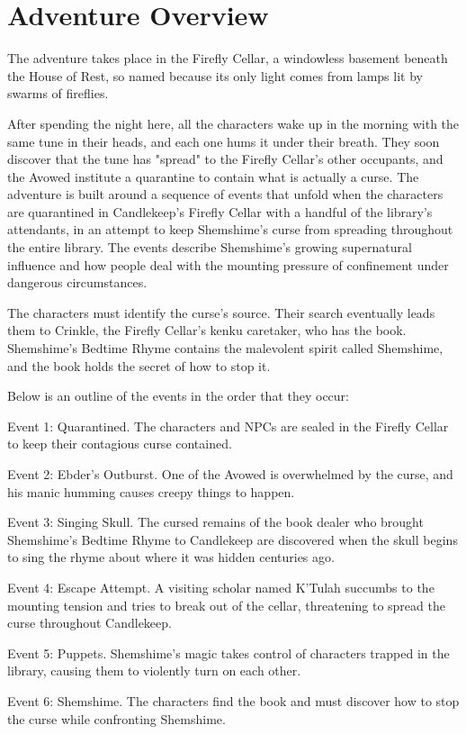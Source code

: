 \documentclass[10pt,a4paper,twoside,bg=print,twocolumn,openany,nodeprecatedcode]{dndbook}
\begin{document}
\section{Adventure Overview}
The adventure takes place in the Firefly Cellar, a windowless basement beneath the House of Rest, so named because its only light comes from lamps lit by swarms of fireflies.

After spending the night here, all the characters wake up in the morning with the same tune in their heads, and each one hums it under their breath. They soon discover that the tune has "spread" to the Firefly Cellar's other occupants, and the Avowed institute a quarantine to contain what is actually a curse. The adventure is built around a sequence of events that unfold when the characters are quarantined in Candlekeep's Firefly Cellar with a handful of the library's attendants, in an attempt to keep Shemshime's curse from spreading throughout the entire library. The events describe Shemshime's growing supernatural influence and how people deal with the mounting pressure of confinement under dangerous circumstances.

The characters must identify the curse's source. Their search eventually leads them to Crinkle, the Firefly Cellar's kenku caretaker, who has the book. Shemshime's Bedtime Rhyme contains the malevolent spirit called Shemshime, and the book holds the secret of how to stop it.

Below is an outline of the events in the order that they occur:

Event 1: Quarantined. The characters and NPCs are sealed in the Firefly Cellar to keep their contagious curse contained.

Event 2: Ebder's Outburst. One of the Avowed is overwhelmed by the curse, and his manic humming causes creepy things to happen.

Event 3: Singing Skull. The cursed remains of the book dealer who brought Shemshime's Bedtime Rhyme to Candlekeep are discovered when the skull begins to sing the rhyme about where it was hidden centuries ago.

Event 4: Escape Attempt. A visiting scholar named K'Tulah succumbs to the mounting tension and tries to break out of the cellar, threatening to spread the curse throughout Candlekeep.

Event 5: Puppets. Shemshime's magic takes control of characters trapped in the library, causing them to violently turn on each other.

Event 6: Shemshime. The characters find the book and must discover how to stop the curse while confronting Shemshime.
\end{document}
